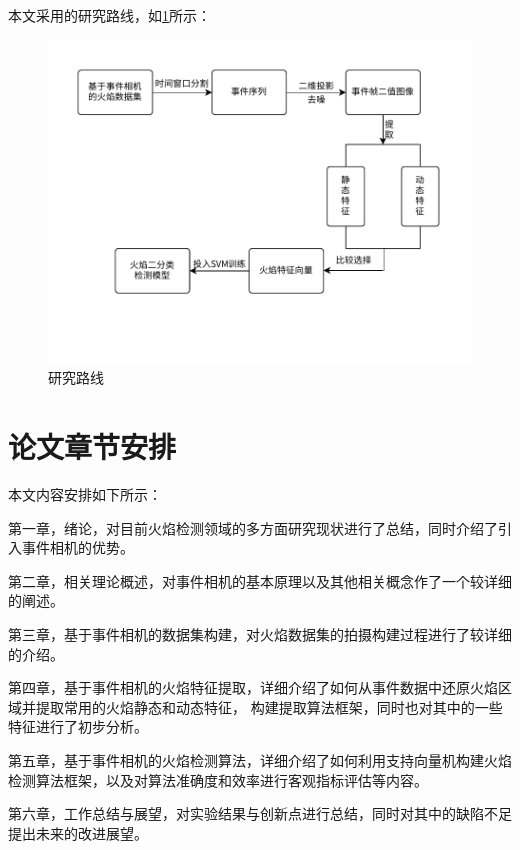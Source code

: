 本文采用的研究路线，如\ref{1}所示：
\begin{figure}
    \centering
    \includegraphics[width=\textwidth]{figures/thesis_flowchart.pdf}
    \caption{研究路线}
    \label{1}
\end{figure}

\section{论文章节安排}

本文内容安排如下所示：

第一章，绪论，对目前火焰检测领域的多方面研究现状进行了总结，同时介绍了引入事件相机的优势。

第二章，相关理论概述，对事件相机的基本原理以及其他相关概念作了一个较详细的阐述。

第三章，基于事件相机的数据集构建，对火焰数据集的拍摄构建过程进行了较详细的介绍。

第四章，基于事件相机的火焰特征提取，详细介绍了如何从事件数据中还原火焰区域并提取常用的火焰静态和动态特征，
构建提取算法框架，同时也对其中的一些特征进行了初步分析。

第五章，基于事件相机的火焰检测算法，详细介绍了如何利用支持向量机构建火焰检测算法框架，以及对算法准确度和效率进行客观指标评估等内容。

第六章，工作总结与展望，对实验结果与创新点进行总结，同时对其中的缺陷不足提出未来的改进展望。

